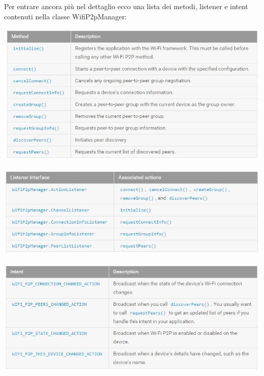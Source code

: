 Per entrare ancora più nel dettaglio ecco una lista dei metodi, listener e intent contenuti nella classe WifiP2pManager:

\begin{center}
\includegraphics[width=1\textwidth]{imgs/p2pmethods.jpg}
\label{p2pmethods_img}%
\end{center}

\begin{center}
\includegraphics[width=1\textwidth]{imgs/p2plistener.jpg}
\label{p2plistener_img}%
\end{center}

\begin{center}
\includegraphics[width=1\textwidth]{imgs/p2pintents.jpg}
\label{p2pintents_img}%
\end{center}

